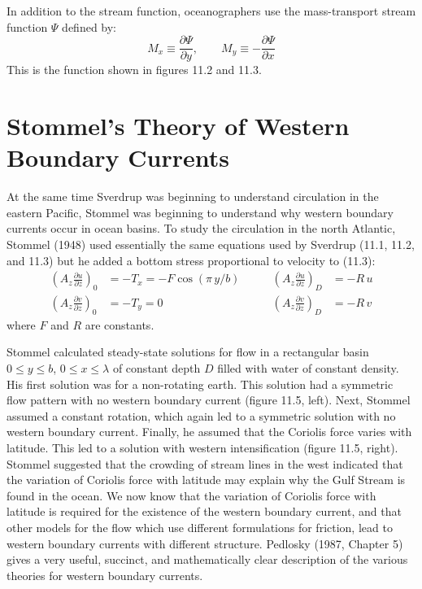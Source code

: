 In addition to the stream function, oceanographers use the mass-transport
stream function $\Psi$ defined by:
\begin{equation}
M_x \equiv \frac{\partial{\Psi}}{\partial{y}}, \qquad M_y \equiv -
\frac{\partial{\Psi}}{\partial{x}}
\end{equation}
This is the function shown in figures 11.2 and 11.3.

\section[Western Boundary Currents]{Stommel's Theory of Western Boundary Currents}
At the same time Sverdrup was beginning to
understand circulation in the eastern Pacific, Stommel was beginning to understand why western boundary currents
occur in ocean basins. To study the circulation in the north Atlantic, Stommel (1948) used essentially the same
equations used by Sverdrup (11.1, 11.2, and 11.3) but he added a bottom stress proportional to velocity to
(11.3):
\begin{subequations}
\begin{alignat}{2}
\left(A_z \frac{\partial{u}}{\partial{z}}\right)_0 &= -T_x =-F\cos(\pi \,y/b)& \qquad \left(A_z \frac{\partial{u}}{\partial{z}}\right)_D &= -R\,u \\
\left(A_z \frac{\partial{v}}{\partial{z}}\right)_0 &= -T_y =0 & \qquad \left(A_z \frac{\partial{v}}{\partial{z}}\right)_D &= -R\,v
\end{alignat}
\end{subequations}
where $F$ and $R$ are constants.

Stommel calculated steady-state solutions for flow in a rectangular basin $0\leq
y\leq b$, $0\leq x\leq \lambda$ of constant depth $D$ filled with water of
constant density. His first solution was for a non-rotating earth. This solution
had a symmetric flow pattern with no western boundary current (figure 11.5,
left). Next, Stommel assumed a constant rotation, which again led to a symmetric
solution with no western boundary current. Finally, he assumed that the Coriolis
force varies with latitude. This led to a solution with western intensification
(figure 11.5, right). Stommel suggested that the crowding of stream lines in the
west indicated that the variation of Coriolis force with latitude may explain
why the Gulf Stream is found in the ocean. We now know
that the variation of Coriolis force with latitude is required for the existence of the western
boundary current, and that other models for the flow which use different
formulations for friction, lead to western boundary currents with different
structure. Pedlosky (1987, Chapter 5) gives a very useful, succinct, and
mathematically clear description of the various theories for western boundary
currents.

